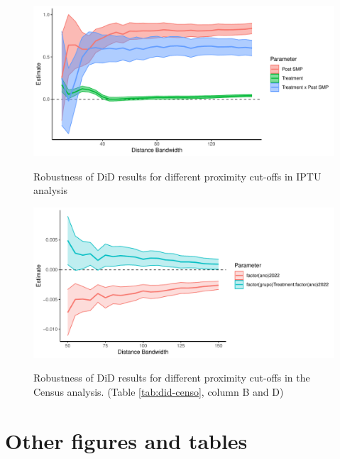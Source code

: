 \begin{apendicesenv}
    
    \begin{figure}[!h]
        \centering
        \caption{Robustness of DiD results for different proximity cut-offs in IPTU analysis}
        \includegraphics[width = \linewidth]{figuras/did-IPTU-bandas.pdf}
        \label{fig:robustez-did-IPTU}
    \end{figure}
    
    \begin{figure}[!h]
        \centering
        \caption{Robustness of DiD results for different proximity cut-offs in the Census analysis. (Table \ref{tab:did-censo}, column B and D)}
        \includegraphics[width = \linewidth]{figuras/did-censo-bandas.pdf}
        \label{fig:robustez-did-censo}
    \end{figure}
    
    
    
    
    
    
    
    
    
    
    
    
    
    
    
    \chapter{Other figures and tables}
    \label{appendix:figures}
    

\end{apendicesenv}
